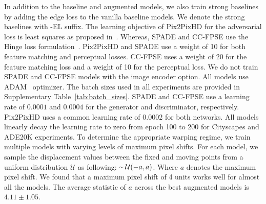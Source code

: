 \documentclass[final]{cvpr}
\newcommand\+{\mkern4mu}
\begin{document}
In addition to the baseline and augmented models, we also train strong baselines by adding the edge loss to the vanilla baseline models. We denote the strong baselines with -EL suffix. The learning objective of Pix2PixHD for the adversarial loss is least squares as proposed in~\cite{mao2017least}. Whereas, SPADE and CC-FPSE use the Hinge loss formulation~\cite{lim2017geometric}. Pix2PixHD and SPADE use a weight of 10 for both feature matching and perceptual losses. CC-FPSE uses a weight of 20 for the feature matching loss and a weight of 10 for the perceptual loss. We do not train SPADE and CC-FPSE models with the image encoder option. All models use ADAM~\cite{adamopt} optimizer. The batch sizes used in all experiments are provided in Supplementary Table~\ref{tab:batch_sizes}. SPADE and CC-FPSE use a learning rate of $0.0001$ and $0.0004$ for the generator and discriminator, respectively. Pix2PixHD uses a common learning rate of $0.0002$ for both networks. All models linearly decay the learning rate to zero from epoch 100 to 200 for Cityscapes and ADE20K experiments. To determine the appropriate warping regime, we train multiple models with varying levels of maximum pixel shifts. For each model, we sample the displacement values between the fixed and moving points from a uniform distribution $\mathcal{U}$ as following: \({\raise.17ex\hbox{$\scriptstyle\mathtt{\sim}$}} \+ \mathcal{U}(-a,a)\). Where $a$ denotes the maximum pixel shift. We found that a maximum pixel shift of 4 units works well for almost all the models. The average statistic of $a$ across the best augmented models is $4.11\pm1.05$.
\end{document}
